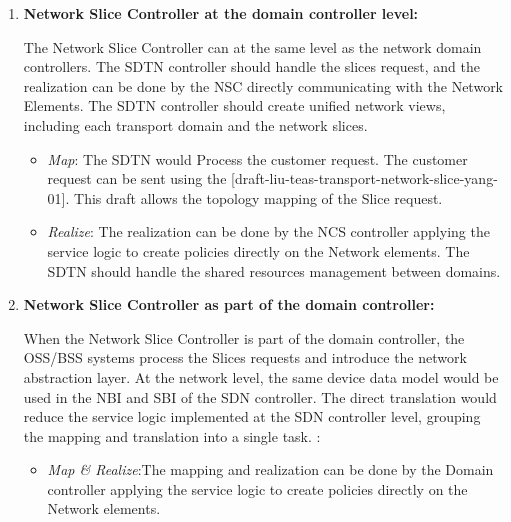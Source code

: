 \documentclass[journal,article,submit,moreauthors,pdftex]{Definitions/mdpi}
\begin{document}
\begin{enumerate}[label=(\alph*)]
    \item \textbf{Network Slice Controller at the domain controller level:}

The Network Slice Controller can at the same level as the network domain controllers. The SDTN controller should handle the slices request, and the realization can be done by the NSC directly communicating with the Network Elements. The SDTN controller should create unified network views, including each transport domain and the network slices.

\begin{itemize}

    \item \textit{Map}: The SDTN would Process the customer request. The customer request can be sent using the [draft-liu-teas-transport-network-slice-yang-01]. This draft allows the topology mapping of the Slice request. 
    
    \item \textit{Realize}: The realization can be done by the NCS controller applying the service logic to create policies directly on the Network elements. The SDTN should handle the shared resources management between domains. 
\end{itemize}    
    
    \item \textbf{Network Slice Controller as part of the domain controller:}
    
When the Network Slice Controller is part of the domain controller, the OSS/BSS systems process the Slices requests and introduce the network abstraction layer. At the network level, the same device data model would be used in the NBI and SBI of the SDN controller. The direct translation would reduce the service logic implemented at the SDN controller level, grouping the mapping and translation into a single task. :

\begin{itemize}
    \item  \textit{Map \& Realize}:The mapping and realization can be done by the Domain controller applying the service logic to create policies directly on the Network elements.
\end{itemize}

\end{enumerate}
\end{document}
